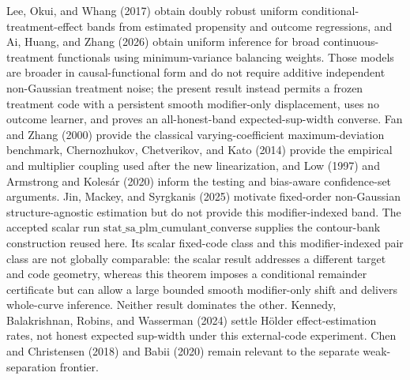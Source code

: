 Lee, Okui, and Whang (2017) obtain doubly robust uniform conditional-treatment-effect bands from estimated propensity and outcome regressions, and Ai, Huang, and Zhang (2026) obtain uniform inference for broad continuous-treatment functionals using minimum-variance balancing weights. Those models are broader in causal-functional form and do not require additive independent non-Gaussian treatment noise; the present result instead permits a frozen treatment code with a persistent smooth modifier-only displacement, uses no outcome learner, and proves an all-honest-band expected-sup-width converse. Fan and Zhang (2000) provide the classical varying-coefficient maximum-deviation benchmark, Chernozhukov, Chetverikov, and Kato (2014) provide the empirical and multiplier coupling used after the new linearization, and Low (1997) and Armstrong and Koles\'ar (2020) inform the testing and bias-aware confidence-set arguments. Jin, Mackey, and Syrgkanis (2025) motivate fixed-order non-Gaussian structure-agnostic estimation but do not provide this modifier-indexed band. The accepted scalar run \(\text{stat\_sa\_plm\_cumulant\_converse}\) supplies the contour-bank construction reused here. Its scalar fixed-code class and this modifier-indexed pair class are not globally comparable: the scalar result addresses a different target and code geometry, whereas this theorem imposes a conditional remainder certificate but can allow a large bounded smooth modifier-only shift and delivers whole-curve inference. Neither result dominates the other. Kennedy, Balakrishnan, Robins, and Wasserman (2024) settle H\"older effect-estimation rates, not honest expected sup-width under this external-code experiment. Chen and Christensen (2018) and Babii (2020) remain relevant to the separate weak-separation frontier.